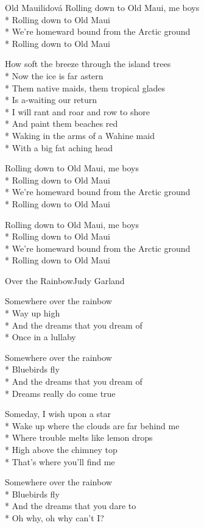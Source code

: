 \documentclass[10.5pt]{book}
\begin{document}
\begin{poem}{Old Maui}{lidová}
Rolling down to Old Maui, me boys\\*
Rolling down to Old Maui\\*
We're homeward bound from the Arctic ground\\*
Rolling down to Old Maui

How soft the breeze through the island trees\\*
Now the ice is far astern\\*
Them native maids, them tropical glades\\*
Is a-waiting our return\\*
I will rant and roar and row to shore\\*
And paint them beaches red\\*
Waking in the arms of a Wahine maid\\*
With a big fat aching head

Rolling down to Old Maui, me boys\\*
Rolling down to Old Maui\\*
We're homeward bound from the Arctic ground\\*
Rolling down to Old Maui

Rolling down to Old Maui, me boys\\*
Rolling down to Old Maui\\*
We're homeward bound from the Arctic ground\\*
Rolling down to Old Maui

\end{poem}
\fi
\iffalse
\begin{poem}{Over the Rainbow}{Judy Garland}

\settowidth{\versewidth}{Wake up where the clouds are far behind me}

Somewhere over the rainbow\\*
Way up high\\*
And the dreams that you dream of\\*
Once in a lullaby

Somewhere over the rainbow\\*
Bluebirds fly\\*
And the dreams that you dream of\\*
Dreams really do come true

Someday, I wish upon a star\\*
Wake up where the clouds are far behind me\\*
Where trouble melts like lemon drops\\*
High above the chimney top\\*
That's where you'll find me

Somewhere over the rainbow\\*
Bluebirds fly\\*
And the dreams that you dare to\\*
Oh why, oh why can't I?

\end{poem}
\end{document}

